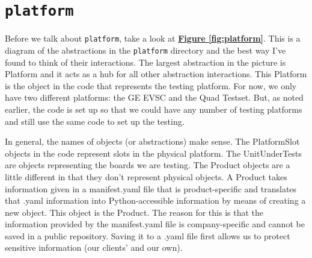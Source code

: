 \documentclass{report}
\begin{document}
\section{\texttt{platform}}
Before we talk about \texttt{platform}, take a look at \hyperref[fig:platform]{\textbf{Figure \ref{fig:platform}}}. This is a diagram of the abstractions in the \texttt{platform} directory and the best way I've found to think of their interactions. The largest abstraction in the picture is Platform and it acts as a hub for all other abstraction interactions. This Platform is the object in the code that represents the testing platform. For now, we only have two different platforms: the GE EVSC and the Quad Testset. But, as noted earlier, the code is set up so that we could have any number of testing platforms and still use the same code to set up the testing. 

In general, the names of objects (or abstractions) make sense. The PlatformSlot objects in the code represent slots in the physical platform. The UnitUnderTests are objects representing the boards we are testing. The Product objects are a little different in that they don't represent physical objects. A Product takes information given in a manifest.yaml file that is product-specific and translates that .yaml information into Python-accessible information by means of creating a new object. This object is the Product. The reason for this is that the information provided by the manifest.yaml file is company-specific and cannot be saved in a public repository. Saving it to a .yaml file first allows us to protect sensitive information (our clients' and our own).\\

	\begin{minipage}{\linewidth}
		\label{fig:platform}
	\end{minipage} 
	\vspace{5pt}		%
\end{document}
